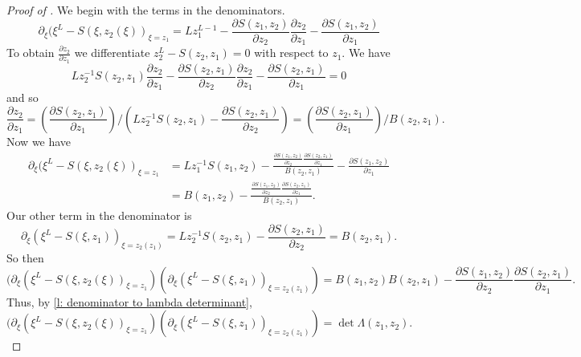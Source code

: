 \documentclass[a4paper,11pt]{article}
\theoremstyle{definition}
\begin{document}
\begin{proof}[Proof of ]
    We begin with the terms in the denominators. 
    \begin{equation}
        \partial_\xi(\xi^L-S(\xi,z_2(\xi))_{\xi=z_1} = Lz_1^{L-1} - \frac{\partial S(z_1,z_2)}{\partial z_2}\frac{\partial z_2}{\partial z_1} - \frac{\partial S(z_1,z_2)}{\partial z_1}
    \end{equation}
    To obtain $\frac{\partial z_2}{\partial z_1}$ we differentiate $z_2^L-S(z_2,z_1)=0$ with respect to $z_1$. We have
    \begin{equation}
        Lz_2^{-1}S(z_2,z_1)\frac{\partial z_2}{\partial z_1}-\frac{\partial S(z_2,z_1)}{\partial z_2} \frac{\partial z_2}{\partial z_1}-\frac{\partial S(z_2,z_1)}{\partial z_1} = 0
    \end{equation}
    and so 
    \begin{equation}
        \frac{\partial z_2}{\partial z_1} = \left(\frac{\partial S(z_2,z_1)}{\partial z_1}\right)/\left(Lz_2^{-1}S(z_2,z_1)-\frac{\partial S(z_2,z_1)}{\partial z_2} \right) = \left(\frac{\partial S(z_2,z_1)}{\partial z_1}\right)/B(z_2,z_1).
    \end{equation}
    Now we have 
    \begin{equation} \label{e: z1 BE first deriv}
        \begin{split}
            \partial_\xi(\xi^L-S(\xi,z_2(\xi))_{\xi=z_1} &= Lz_1^{-1}S(z_1,z_2) - \frac{\frac{\partial S(z_1,z_2)}{\partial z_2}\frac{\partial S(z_2,z_1)}{\partial z_1}}{B(z_2,z_1)} - \frac{\partial S(z_1,z_2)}{\partial z_1} \\
            &= B(z_1,z_2) - \frac{\frac{\partial S(z_1,z_2)}{\partial z_2}\frac{\partial S(z_2,z_1)}{\partial z_1}}{B(z_2,z_1)}.
        \end{split}
    \end{equation}
    Our other term in the denominator is
    \begin{equation}
        \partial_\xi (\xi^L-S(\xi,z_1))_{\xi=z_2(z_1)} = Lz_2^{-1}S(z_2,z_1) - \frac{\partial S(z_2,z_1)}{\partial z_2} = B(z_2,z_1). 
    \end{equation}
    So then 
    \begin{equation}
       (\partial_\xi(\xi^L-S(\xi,z_2(\xi))_{\xi=z_1}) (\partial_\xi (\xi^L-S(\xi,z_1))_{\xi=z_2(z_1)}) = B(z_1,z_2)B(z_2,z_1) - \frac{\partial S(z_1,z_2)}{\partial z_2}\frac{\partial S(z_2,z_1)}{\partial z_1}.
    \end{equation}
    Thus, by \eqref{l: denominator to lambda determinant}, 
    \begin{equation}
        (\partial_\xi(\xi^L-S(\xi,z_2(\xi))_{\xi=z_1}) (\partial_\xi (\xi^L-S(\xi,z_1))_{\xi=z_2(z_1)})  = \det\Lambda(z_1,z_2). 
    \end{equation}
\end{proof}
\end{document}
